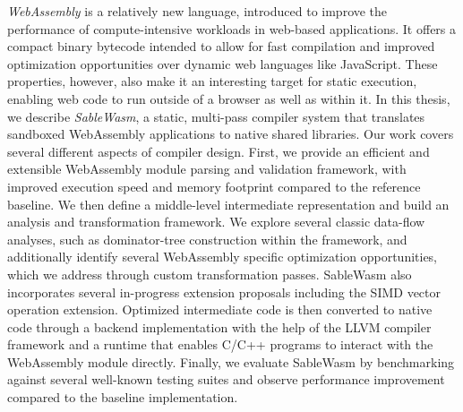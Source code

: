 \emph{WebAssembly} is a relatively new language, introduced to improve the
performance of compute-intensive workloads in web-based applications. It offers
a compact binary bytecode intended to allow for fast compilation and improved
optimization opportunities over dynamic web languages like JavaScript. These
properties, however, also make it an interesting target for static execution,
enabling web code to run outside of a browser as well as within it. In this
thesis, we describe \emph{SableWasm}, a static, multi-pass compiler system that
translates sandboxed WebAssembly applications to native shared libraries. Our
work covers several different aspects of compiler design. First, we provide an
efficient and extensible WebAssembly module parsing and validation framework,
with improved execution speed and memory footprint compared to the reference
baseline. We then define a middle-level intermediate representation and build
an analysis and transformation framework. We explore several classic data-flow
analyses, such as dominator-tree construction within the framework, and
additionally identify several WebAssembly specific optimization opportunities,
which we address through custom transformation passes. SableWasm also
incorporates several in-progress extension proposals including the SIMD vector
operation extension. Optimized intermediate code is then converted to native
code through a backend implementation with the help of the LLVM compiler
framework and a runtime that enables C/C++ programs to interact with the
WebAssembly module directly. Finally, we evaluate SableWasm by benchmarking
against several well-known testing suites and observe performance improvement
compared to the baseline implementation.